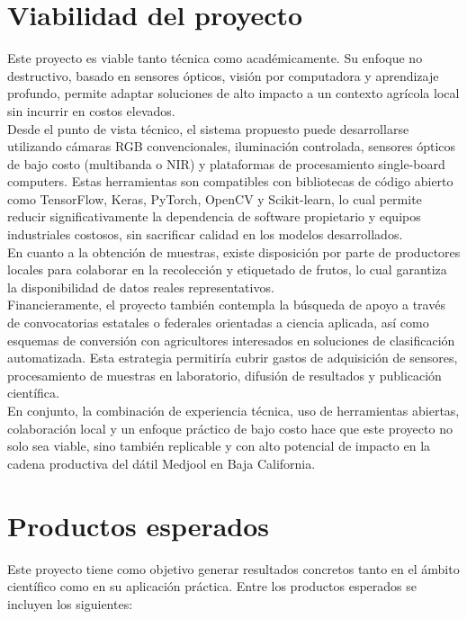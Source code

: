 \section{Viabilidad del proyecto}

Este proyecto es viable tanto técnica como académicamente. Su enfoque no destructivo, basado en sensores ópticos, visión por computadora y aprendizaje profundo, permite adaptar soluciones de alto impacto a un contexto agrícola local sin incurrir en costos elevados.\\

Desde el punto de vista técnico, el sistema propuesto puede desarrollarse utilizando cámaras RGB convencionales, iluminación controlada, sensores ópticos de bajo costo (multibanda o NIR) y plataformas de procesamiento single-board computers. Estas herramientas son compatibles con bibliotecas de código abierto como TensorFlow, Keras, PyTorch, OpenCV y Scikit-learn, lo cual permite reducir significativamente la dependencia de software propietario y equipos industriales costosos, sin sacrificar calidad en los modelos desarrollados.\\

En cuanto a la obtención de muestras, existe disposición por parte de productores locales para colaborar en la recolección y etiquetado de frutos, lo cual garantiza la disponibilidad de datos reales representativos.\\

Financieramente, el proyecto también contempla la búsqueda de apoyo a través de convocatorias estatales o federales orientadas a ciencia aplicada, así como esquemas de conversión con agricultores interesados en soluciones de clasificación automatizada. Esta estrategia permitiría cubrir gastos de adquisición de sensores, procesamiento de muestras en laboratorio, difusión de resultados y publicación científica.\\

En conjunto, la combinación de experiencia técnica, uso de herramientas abiertas, colaboración local y un enfoque práctico de bajo costo hace que este proyecto no solo sea viable, sino también replicable y con alto potencial de impacto en la cadena productiva del dátil Medjool en Baja California.

\section{Productos esperados}

Este proyecto tiene como objetivo generar resultados concretos tanto en el ámbito científico como en su aplicación práctica. Entre los productos esperados se incluyen los siguientes:

